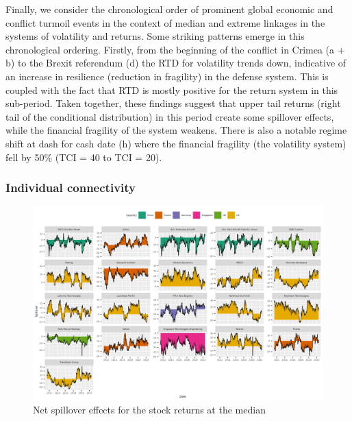 \documentclass[
  number]{elsarticle}
\begin{document}
Finally, we consider the chronological order of prominent global
economic and conflict turmoil events in the context of median and
extreme linkages in the systems of volatility and returns. Some striking
patterns emerge in this chronological ordering. Firstly, from the
beginning of the conflict in Crimea (a + b) to the Brexit referendum (d)
the RTD for volatility trends down, indicative of an increase in
resilience (reduction in fragility) in the defense system. This is
coupled with the fact that RTD is mostly positive for the return system
in this sub-period. Taken together, these findings suggest that upper
tail returns (right tail of the conditional distribution) in this period
create some spillover effects, while the financial fragility of the
system weakens. There is also a notable regime shift at dash for cash
date (h) where the financial fragility (the volatility system) fell by
50\% (TCI = 40 to TCI = 20).

\hypertarget{individual-connectivity}{%
\subsubsection{Individual connectivity}\label{individual-connectivity}}

\begin{figure}[H]

{\centering \includegraphics[width=1\textwidth,height=\textheight]{plots/fig-rtnnet50.png}

}

\caption{\label{fig-rtnet50}Net spillover effects for the stock returns
at the median}

\end{figure}
\end{document}
